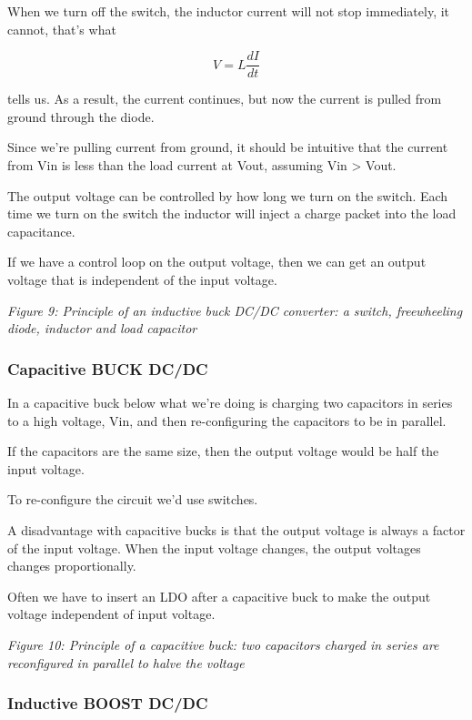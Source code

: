 When we turn off the switch, the inductor current will not stop
immediately, it cannot, that's what

\[ V = L \frac{d I}{dt}\]

tells us. As a result, the current continues, but now the current is
pulled from ground through the diode.

Since we're pulling current from ground, it should be intuitive that the
current from Vin is less than the load current at Vout, assuming Vin
\textgreater{} Vout.

The output voltage can be controlled by how long we turn on the switch.
Each time we turn on the switch the inductor will inject a charge packet
into the load capacitance.

If we have a control loop on the output voltage, then we can get an
output voltage that is independent of the input voltage.


{
\centering
{}
}

\emph{Figure 9: Principle of an inductive buck DC/DC converter: a
switch, freewheeling diode, inductor and load capacitor}

\subsubsection{Capacitive BUCK DC/DC}\label{capacitive-buck-dcdc}

In a capacitive buck below what we're doing is charging two capacitors
in series to a high voltage, Vin, and then re-configuring the capacitors
to be in parallel.

If the capacitors are the same size, then the output voltage would be
half the input voltage.

To re-configure the circuit we'd use switches.

A disadvantage with capacitive bucks is that the output voltage is
always a factor of the input voltage. When the input voltage changes,
the output voltages changes proportionally.

Often we have to insert an LDO after a capacitive buck to make the
output voltage independent of input voltage.


{
\centering
{}
}

\emph{Figure 10: Principle of a capacitive buck: two capacitors charged
in series are reconfigured in parallel to halve the voltage}

\subsubsection{Inductive BOOST DC/DC}\label{inductive-boost-dcdc}

